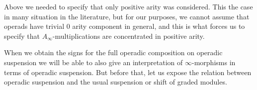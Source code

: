 \documentclass[join.tex]{subfiles}
\begin{document}
\begin{remark}
Above we needed to specify that only positive arity was considered. This the case in many situation in the literature, but for our purposes, we cannot assume that operads have trivial 0 arity component in general, and this is what forces us to specify that $A_\infty$-multiplications are concentrated in positive arity.
\end{remark} %




 



When we obtain the signs for the full operadic composition on operadic suspension we will be able to also give an interpretation of $\infty$-morphisms in terms of operadic suspension. But before that, let us expose the relation between operadic suspension and the usual suspension or shift of graded modules.
\end{document}
